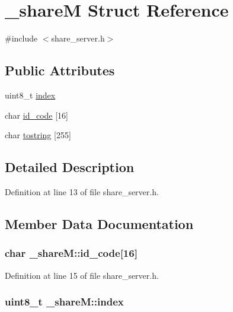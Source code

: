 \hypertarget{struct__share_m}{\section{\-\_\-share\-M Struct Reference}
\label{struct__share_m}
}


{\ttfamily \#include $<$share\-\_\-server.\-h$>$}

\subsection*{Public Attributes}
\begin{DoxyCompactItemize}
\item 
uint8\-\_\-t \hyperlink{struct__share_m_a30792c4b007e8273d3832fe2d5e70987}{index}
\item 
char \hyperlink{struct__share_m_aba5b7eea37d1a2b8eade0ea20ad1b4d8}{id\-\_\-code} \mbox{[}16\mbox{]}
\item 
char \hyperlink{struct__share_m_a3f1adf9dcef316bf853e709401b041fd}{tostring} \mbox{[}255\mbox{]}
\end{DoxyCompactItemize}


\subsection{Detailed Description}


Definition at line 13 of file share\-\_\-server.\-h.



\subsection{Member Data Documentation}
\hypertarget{struct__share_m_aba5b7eea37d1a2b8eade0ea20ad1b4d8}{
\subsubsection[{id\-\_\-code}]{\setlength{\rightskip}{0pt plus 5cm}char \-\_\-share\-M\-::id\-\_\-code\mbox{[}16\mbox{]}}}\label{struct__share_m_aba5b7eea37d1a2b8eade0ea20ad1b4d8}


Definition at line 15 of file share\-\_\-server.\-h.

\hypertarget{struct__share_m_a30792c4b007e8273d3832fe2d5e70987}{
\subsubsection[{index}]{\setlength{\rightskip}{0pt plus 5cm}uint8\-\_\-t \-\_\-share\-M\-::index}}\label{struct__share_m_a30792c4b007e8273d3832fe2d5e70987}



